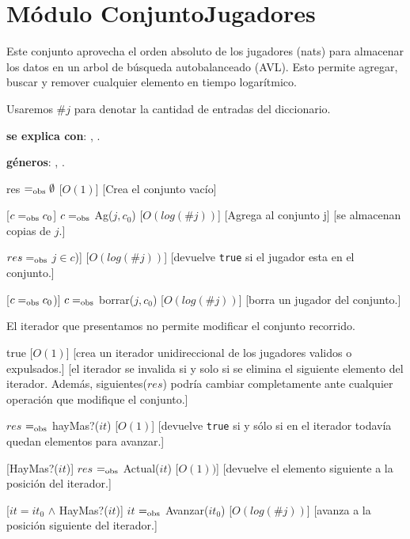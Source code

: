 \section{Módulo ConjuntoJugadores}

Este conjunto aprovecha el orden absoluto de los jugadores (nats) para almacenar los datos en un arbol de búsqueda autobalanceado (AVL). Esto permite agregar, buscar y remover cualquier elemento en tiempo logarítmico.

Usaremos $\#j$ para denotar la cantidad de entradas del diccionario.

\begin{Interfaz}
	\textbf{se explica con}: , .

	\textbf{géneros}: , .


	{res $=_{\mathrm{obs}} \emptyset$ }
	[$O(1)$]
	[Crea el conjunto vacío]

	[$c =_{\mathrm{obs}} c_0$]
	{$c =_{\mathrm{obs}}$ Ag($j, c_0$)}
	[$O(log(\#j))$]
	[Agrega al conjunto j]
	[se almacenan copias de $j$.]

	{$res =_{\mathrm{obs}}$ $j \in c$)]}
	[$O(log(\#j))$]
	[devuelve \texttt{true} si el jugador esta en el conjunto.]

	[$c =_{\mathrm{obs}} c_0$)]
	{$c =_{\mathrm{obs}}$ borrar($j, c_0$)}
	[$O(log(\#j))$]
	[borra un jugador del conjunto.]



	El iterador que presentamos no permite modificar el conjunto recorrido.


	{true}
	[$O(1)$]
	[crea un iterador unidireccional de los jugadores validos o expulsados.]
	[el iterador se invalida si y solo si se elimina el siguiente elemento del iterador. Además, siguientes($res$) podría cambiar completamente ante cualquier operación que modifique el conjunto.]

	{$res$ $=_{\mathrm{obs}}$ hayMas?($it$)}
	[$O(1)$]
	[devuelve \texttt{true} si y sólo si en el iterador todavía quedan elementos para avanzar.]

	[HayMas?($it$)]
	{$res$ $=_{\mathrm{obs}}$ Actual($it$)}
	[$O(1))$]
	[devuelve el elemento siguiente a la posición del iterador.]

	[$it = it_0$ $\land$ HayMas?($it$)]
	{$it$ $=_{\mathrm{obs}}$ Avanzar($it_0$)}
	[$O(log(\#j))$]
	[avanza a la posición siguiente del iterador.]

\end{Interfaz}


